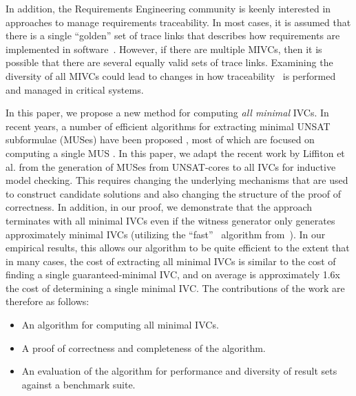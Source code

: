 \noindent In addition, the Requirements Engineering community is keenly interested in approaches to manage requirements traceability.  In most cases, it is assumed that there is a single ``golden'' set of trace links that describes how requirements are implemented in software~\cite{COEST,hayes2003improving,cleland2007best}. However, if there are multiple MIVCs, then it is possible that there are several equally valid sets of trace links.  Examining the diversity of all MIVCs could lead to changes in how traceability~\cite{COEST,hayes2003improving,cleland2007best} is performed and managed in critical systems.


In this paper, we propose a new method for computing \emph{all minimal} IVCs. In  recent  years,  a  number  of  efficient
algorithms  for  extracting minimal UNSAT subformulae (MUSes)  have  been proposed 
\cite{liffiton2005max},
most of which are focused on computing a single MUS  \cite{bacchus2015using, belov2012muser2, belov2013core, belov2012towards, nadel2014accelerated}.  In this paper, we adapt the recent work by Liffiton et al. \cite{marco2016fast} from the generation of MUSes from UNSAT-cores to all IVCs for inductive model checking.  This requires changing the underlying mechanisms that are used to construct candidate solutions and also changing the structure of the proof of correctness.  In addition, in our proof, we demonstrate that the approach terminates with all minimal IVCs even if the witness generator only generates approximately minimal IVCs (utilizing the ``fast'' \ucalg\ algorithm from~\cite{Ghass16}).  In our empirical results, this allows our algorithm to be quite efficient to the extent that in many cases, the cost of extracting all minimal IVCs is similar to the cost of finding a single guaranteed-minimal IVC, and on average is approximately 1.6x the cost of determining a single minimal IVC.
The contributions of the work are therefore as follows:
\begin{itemize}
    \item An algorithm for computing all minimal IVCs.
    \item A proof of correctness and completeness of the algorithm.
    \item An evaluation of the algorithm for performance and diversity of result sets against a benchmark suite.
\end{itemize}

